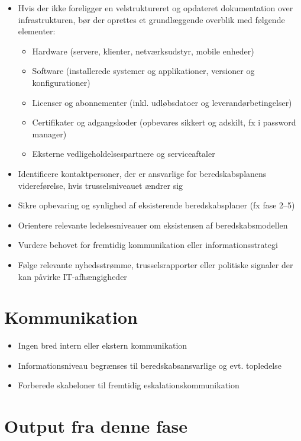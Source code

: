 \documentclass[a4paper,11pt,oneside]{book}
\def\tightlist{}
\begin{document}
\begin{itemize}
\item
  Hvis der ikke foreligger en velstruktureret og opdateret dokumentation
  over infrastrukturen, bør der oprettes et grundlæggende overblik med
  følgende elementer:

  \begin{itemize}
  \tightlist
  \item
    Hardware (servere, klienter, netværksudstyr, mobile enheder)
  \item
    Software (installerede systemer og applikationer, versioner og
    konfigurationer)
  \item
    Licenser og abonnementer (inkl. udløbsdatoer og
    leverandørbetingelser)
  \item
    Certifikater og adgangskoder (opbevares sikkert og adskilt, fx i
    password manager)
  \item
    Eksterne vedligeholdelsespartnere og serviceaftaler
  \end{itemize}
\item
  Identificere kontaktpersoner, der er ansvarlige for beredskabsplanens
  videreførelse, hvis trusselsniveauet ændrer sig
\item
  Sikre opbevaring og synlighed af eksisterende beredskabsplaner (fx
  fase 2--5)
\item
  Orientere relevante ledelsesniveauer om eksistensen af
  beredskabsmodellen
\item
  Vurdere behovet for fremtidig kommunikation eller informationsstrategi
\item
  Følge relevante nyhedsstrømme, trusselsrapporter eller politiske
  signaler der kan påvirke IT-afhængigheder
\end{itemize}

\section{Kommunikation}\label{kommunikation}

\begin{itemize}
\tightlist
\item
  Ingen bred intern eller ekstern kommunikation
\item
  Informationsniveau begrænses til beredskabsansvarlige og evt.
  topledelse
\item
  Forberede skabeloner til fremtidig eskalationskommunikation
\end{itemize}

\section{Output fra denne fase}\label{output-fra-denne-fase}
\end{document}
